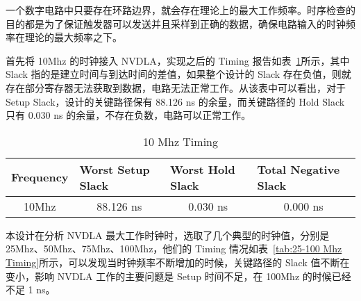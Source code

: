 一个数字电路中只要存在环路边界，就会存在理论上的最大工作频率。时序检查的目的都是为了保证触发器可以发送并且采样到正确的数据，确保电路输入的时钟频率在理论的最大频率之下。

首先将 10Mhz 的时钟接入 NVDLA，实现之后的 Timing 报告如表~\ref{tab:10Mhz Timing}所示，其中 Slack 指的是建立时间与到达时间的差值，如果整个设计的 Slack 存在负值，则就存在部分寄存器无法获取到数据，电路无法正常工作。从该表中可以看出，对于 Setup Slack，设计的关键路径保有 88.126 ns 的余量，而关键路径的 Hold Slack 只有 0.030 ns 的余量，不存在负数，电路可以正常工作。

\begin{table}[!htbp]
    \caption{10 Mhz Timing}
    \label{tab:10Mhz Timing}
    \centering
    \footnotesize%
    \setlength{\tabcolsep}{4pt}%
    \renewcommand{\arraystretch}{1.2}%
    \begin{tabular}{llll}
        \toprule
        \textbf{Frequency}        & \textbf{Worst Setup Slack}    & \textbf{Worst Hold Slack}    & \textbf{Total Negative Slack} \\
        \midrule
        \multicolumn{1}{c}{10Mhz} & \multicolumn{1}{c}{88.126 ns} & \multicolumn{1}{c}{0.030 ns} & \multicolumn{1}{c}{0.000 ns} \\
        \bottomrule                   
    \end{tabular}
\end{table}

本设计在分析 NVDLA 最大工作时钟时，选取了几个典型的时钟值，分别是 25Mhz、50Mhz、75Mhz、100Mhz，他们的 Timing 情况如表~\ref{tab:25-100 Mhz Timing}所示，可以发现当时钟频率不断增加的时候，关键路径的 Slack 值不断在变小，影响 NVDLA 工作的主要问题是 Setup 时间不足，在 100Mhz 的时候已经不足 1 ns。

